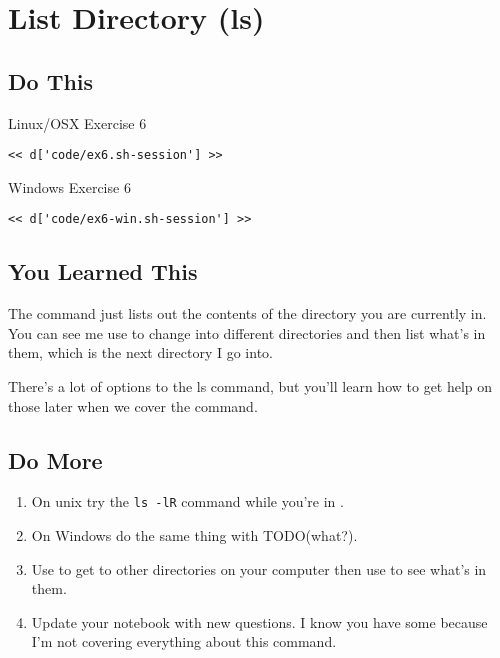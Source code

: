 \chapter{List Directory (ls)}

\section{Do This}

\begin{code}{Linux/OSX Exercise 6}
\begin{Verbatim}
<< d['code/ex6.sh-session'] >>
\end{Verbatim}
\end{code}

\begin{code}{Windows Exercise 6}
\begin{Verbatim}
<< d['code/ex6-win.sh-session'] >>
\end{Verbatim}
\end{code}

\section{You Learned This}

The  command just lists out the contents of the directory you
are currently in.  You can see me use  to change into different
directories and then list what's in them, which is the next directory I
go into.

There's a lot of options to the ls command, but you'll learn how to get
help on those later when we cover the  command.

\section{Do More}

\begin{enumerate}
\item On unix try the \verb|ls -lR| command while you're in .
\item On Windows do the same thing with TODO(what?).
\item Use  to get to other directories on your computer then use  to see what's in them.
\item Update your notebook with new questions.  I know you have some because I'm
    not covering everything about this command.
\end{enumerate}

